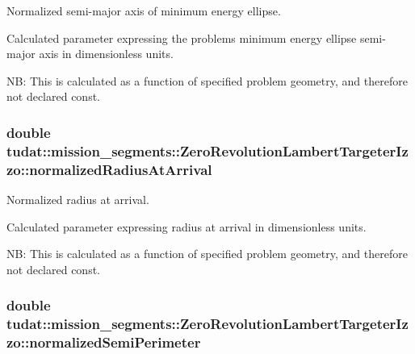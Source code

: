 Normalized semi-\/major axis of minimum energy ellipse. 

Calculated parameter expressing the problem\textquotesingle{}s minimum energy ellipse semi-\/major axis in dimensionless units.

NB\+: This is calculated as a function of specified problem geometry, and therefore not declared const. 
\subsubsection[{\texorpdfstring{normalized\+Radius\+At\+Arrival}{normalizedRadiusAtArrival}}]{\setlength{\rightskip}{0pt plus 5cm}double tudat\+::mission\+\_\+segments\+::\+Zero\+Revolution\+Lambert\+Targeter\+Izzo\+::normalized\+Radius\+At\+Arrival\hspace{0.3cm}{\ttfamily [protected]}}\hypertarget{classtudat_1_1mission__segments_1_1ZeroRevolutionLambertTargeterIzzo_a4133b5fc450c7c15ca666d0983fa923d}{}\label{classtudat_1_1mission__segments_1_1ZeroRevolutionLambertTargeterIzzo_a4133b5fc450c7c15ca666d0983fa923d}


Normalized radius at arrival. 

Calculated parameter expressing radius at arrival in dimensionless units.

NB\+: This is calculated as a function of specified problem geometry, and therefore not declared const. 
\subsubsection[{\texorpdfstring{normalized\+Semi\+Perimeter}{normalizedSemiPerimeter}}]{\setlength{\rightskip}{0pt plus 5cm}double tudat\+::mission\+\_\+segments\+::\+Zero\+Revolution\+Lambert\+Targeter\+Izzo\+::normalized\+Semi\+Perimeter\hspace{0.3cm}{\ttfamily [protected]}}\hypertarget{classtudat_1_1mission__segments_1_1ZeroRevolutionLambertTargeterIzzo_a5cde7bf679ff8e2099c5350dbbb103aa}{}\label{classtudat_1_1mission__segments_1_1ZeroRevolutionLambertTargeterIzzo_a5cde7bf679ff8e2099c5350dbbb103aa}



